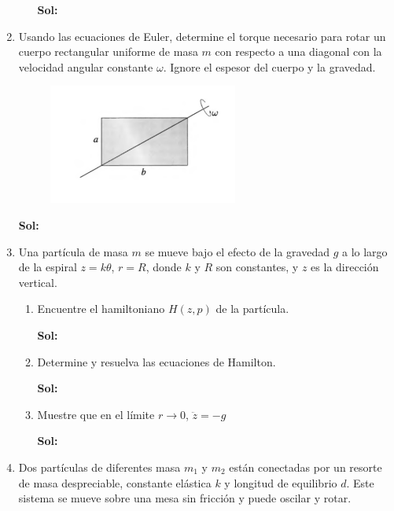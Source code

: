 \documentclass[12pt,a4paper]{article}
\begin{document}
\begin{enumerate}
\begin{enumerate}
    \textbf{Sol:}
\end{enumerate}






\item Usando las ecuaciones de Euler, determine el torque necesario para rotar un cuerpo rectangular uniforme de masa $m$ con respecto a una diagonal con la velocidad angular constante $\omega$. Ignore el espesor del cuerpo y la gravedad.

\begin{figure}[h!]
    \centering
    \includegraphics{5.PNG}
\end{figure}

\textbf{Sol:}






\item Una partícula de masa $m$ se mueve bajo el efecto de la gravedad $g$ a lo largo de la espiral $z = k \theta$, $r = R$, donde $k$ y $R$ son constantes, y $z$ es la dirección vertical.

\begin{enumerate}
    \item Encuentre el hamiltoniano $H(z,p)$ de la partícula.
    
    \textbf{Sol:}
    
    \item Determine y resuelva las ecuaciones de Hamilton.
    
    \textbf{Sol:}
    
    \item Muestre que en el límite $r \rightarrow 0$, $\ddot{z} = -g$
    
    \textbf{Sol:}
    
\end{enumerate}






\item Dos partículas de diferentes masa $m_1$ y $m_2$ están conectadas por un resorte de masa despreciable, constante elástica $k$ y longitud de equilibrio $d$. Este sistema se mueve sobre una mesa sin fricción y puede oscilar y rotar.


\end{enumerate}
\end{document}
